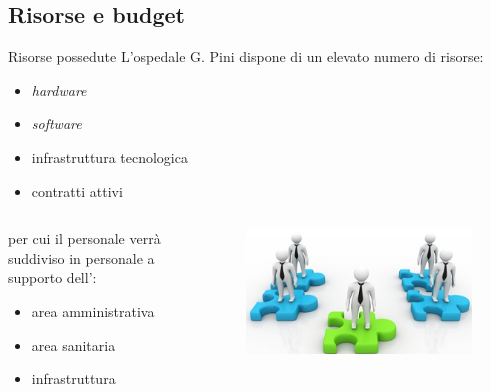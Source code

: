 \subsection*{Risorse e budget}
\begin{frame}{Risorse possedute}
L'ospedale G. Pini dispone di un elevato numero di risorse:
\begin{itemize}
\item{\textit{hardware}}
\item{\textit{software}}
\item{infrastruttura tecnologica}
\item{contratti attivi}
\end{itemize}
\vspace{5mm}
\begin{columns}
\begin{column}{0.7\textwidth}
per cui il personale verrà suddiviso in personale a supporto dell':
\begin{itemize}
\item{area amministrativa}
\item{area sanitaria}
\item{infrastruttura}
\end{itemize}
\end{column}
\begin{column}{0.3\textwidth}
\begin{figure}
\includegraphics[scale=0.15]{Images/Categories.png}
\end{figure}
\end{column}
\end{columns}
\end{frame}

